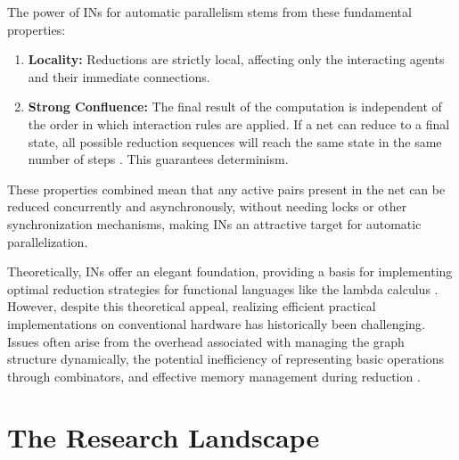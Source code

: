 
The power of INs for automatic parallelism stems from these fundamental properties:
\begin{enumerate}
    \item \textbf{Locality:} Reductions are strictly local, affecting only the interacting agents and their immediate connections.
    \item \textbf{Strong Confluence:} The final result of the computation is independent of the order in which interaction rules are applied. If a net can reduce to a final state, all possible reduction sequences will reach the same state in the same number of steps \cite{mazza}. This guarantees determinism.
\end{enumerate}

These properties combined mean that any active pairs present in the net can be reduced concurrently and asynchronously, without needing locks or other synchronization mechanisms, making INs an attractive target for automatic parallelization.


Theoretically, INs offer an elegant foundation, providing a basis for implementing optimal reduction strategies for functional languages like the lambda calculus \cite{mazza}. However, despite this theoretical appeal, realizing efficient practical implementations on conventional hardware has historically been challenging. Issues often arise from the overhead associated with managing the graph structure dynamically, the potential inefficiency of representing basic operations through combinators, and effective memory management during reduction \cite{Pinto2014InteractionNetsReview}.


\section{The Research Landscape}

